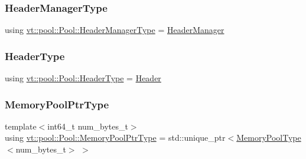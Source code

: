 \subsubsection{\texorpdfstring{Header\+Manager\+Type}{HeaderManagerType}}
{\footnotesize\ttfamily using \hyperlink{structvt_1_1pool_1_1_pool_acc5ad2d64bf6ff58fead958a69c12d74}{vt\+::pool\+::\+Pool\+::\+Header\+Manager\+Type} =  \hyperlink{structvt_1_1pool_1_1_header_manager}{Header\+Manager}}

\mbox{\label{structvt_1_1pool_1_1_pool_a887de970f8d8fbec63df120348c31404}} 
\subsubsection{\texorpdfstring{Header\+Type}{HeaderType}}
{\footnotesize\ttfamily using \hyperlink{structvt_1_1pool_1_1_pool_a887de970f8d8fbec63df120348c31404}{vt\+::pool\+::\+Pool\+::\+Header\+Type} =  \hyperlink{structvt_1_1pool_1_1_header}{Header}}

\mbox{\label{structvt_1_1pool_1_1_pool_a21e20f5b56c3bae4f0d0cc36ed9c5eee}} 
\subsubsection{\texorpdfstring{Memory\+Pool\+Ptr\+Type}{MemoryPoolPtrType}}
{\footnotesize\ttfamily template$<$int64\+\_\+t num\+\_\+bytes\+\_\+t$>$ \\
using \hyperlink{structvt_1_1pool_1_1_pool_a21e20f5b56c3bae4f0d0cc36ed9c5eee}{vt\+::pool\+::\+Pool\+::\+Memory\+Pool\+Ptr\+Type} =  std\+::unique\+\_\+ptr$<$\hyperlink{structvt_1_1pool_1_1_pool_a06673914350d933ad5205155eca14a3b}{Memory\+Pool\+Type}$<$num\+\_\+bytes\+\_\+t$>$ $>$}

\mbox{\label{structvt_1_1pool_1_1_pool_a06673914350d933ad5205155eca14a3b}} 
